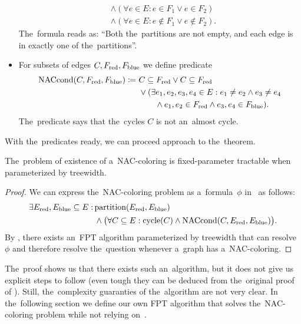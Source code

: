 \begin{itemize}
\begin{align*}
		       & \land (\forall e \in E : e \in F_1 \lor e \in F_2 )          \\
		       & \land (\forall e \in E : e \not\in F_1 \lor e \not\in F_2 ).
	      \end{align*}
	      The~formula reads as: ``Both the~partitions are not empty,
	      and each edge is in exactly one of the~partitions''.
	\item For subsets of edges \( C, F_{\text{red}}, F_{\text{blue}} \) we define predicate
	      \begin{align*}
		      \text{NACcond}(C, F_{\text{red}}, F_{\text{blue}}) \coloneqq \ 
		       & C \subseteq F_{\text{red}} \lor C \subseteq F_{\text{red}}
		      \\
		       & \lor (\exists e_1, e_2, e_3, e_4 \in E :
		      e_1 \ne e_2 \land e_3 \ne e_4
		      \\
		       & \qquad \land e_1, e_2 \in F_{\text{red}} \land e_3, e_4 \in F_{\text{blue}} ).
	      \end{align*}
	      The~predicate says that the~cycles \( C \) is not an~almost cycle.
\end{itemize}
%

With the~predicates ready, we can proceed approach to the~theorem.
%
\begin{theorem}
	The~problem of existence of a~NAC-coloring is fixed-parameter
	tractable when parameterized by treewidth.
\end{theorem}
%
\begin{proof}
	We can express the~NAC-coloring problem
	as a~formula~\( \phi \) in~\MSO{} as follows:
	\begin{align*}
		\exists E_{\text{red}}, E_{\text{blue}} \subseteq E : \,
		 & \text{partition}(E_{\text{red}}, E_{\text{blue}})                                                                 \\
		 & \land \big(\forall C \subseteq E : \text{cycle}(C) \land \text{NACcond}(C, E_{\text{red}}, E_{\text{blue}}) \big)
		.
	\end{align*}
	By ,
	there exists an~FPT algorithm parameterized by treewidth
	that can resolve \( \phi \) and therefore resolve the~question whenever a~graph has a~NAC-coloring.
\end{proof}
%
The~proof shows us that there exists such an~algorithm,
but it does not give us explicit steps to follow
(even tough they can be deduced from the~original proof of ).
Still, the~complexity guaranties of the~algorithm are not very clear.
In the~following section we define our
own FPT algorithm that solves the~NAC-coloring problem
while not relying on~\MSO{}.




